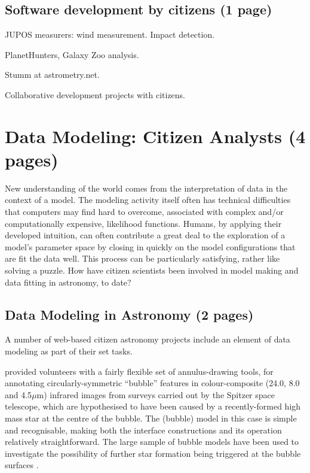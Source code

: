 \documentclass{ar2e}
\begin{document}


\subsection{Software development by citizens (1 page)}
\label{sec:instr:software}

JUPOS measurers: wind measurement. 
Impact detection.

PlanetHunters, Galaxy Zoo analysis.

Stumm at astrometry.net.  

Collaborative development projects with citizens. 




\section{Data Modeling: Citizen Analysts (4 pages)}
\label{sec:model}

New understanding of the world comes from the interpretation of data in the
context of a model. The modeling activity itself often has technical
difficulties that computers may find hard to overcome, associated with complex
and/or computationally expensive, likelihood functions. Humans, by applying
their developed intuition, can often contribute a great deal to the
exploration of a model's parameter space by closing in quickly on the model
configurations that are fit the data well. This process can be particularly
satisfying, rather like solving a puzzle. How have citizen scientists been
involved in model making and data fitting in astronomy, to date?



\subsection{Data Modeling in Astronomy (2 pages)}
\label{sec:model:astro}

A number of  web-based citizen astronomy projects include an element of data
modeling as part of their set tasks. 

\citet{SimpsonEtal2012} provided volunteers with a fairly flexible set of
annulus-drawing tools, for annotating circularly-symmetric ``bubble'' features
in colour-composite (24.0, 8.0 and  4.5$\mu$m) infrared images from surveys
carried out by the Spitzer space telescope, which are hypothesised to have
been caused by a recently-formed high mass star at the centre of the bubble.
The (bubble) model in this case is simple and recognisable, making both the
interface constructions and its operation relatively straightforward. The
large sample of  bubble models have been used to investigate the possibility
of further star formation being triggered at the bubble surfaces
\citep{KendrewEtal2012}.
\end{document}
